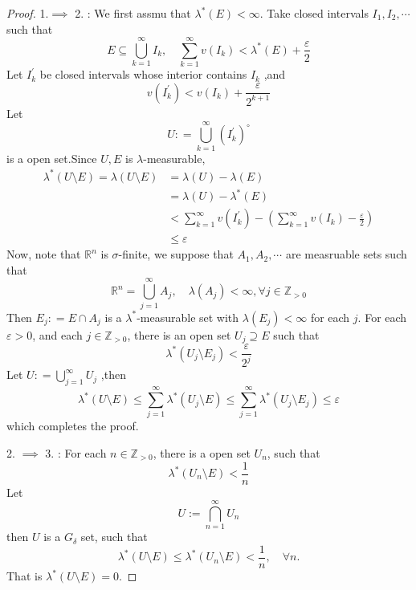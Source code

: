 \documentclass[../main.tex]{subfiles}
\begin{document}
 \begin{proof}
    1.\(  \implies   \) 2. : We first assmu that \(   \lambda ^{*}\left( E \right)< \infty   \).   Take closed intervals \(  I_1,I_2,\cdots   \) such that \[
    E\subseteq \bigcup _{k= 1}^{\infty}I _{k},\quad \sum _{k = 1}^{\infty}v\left( I _{k} \right)<  \lambda ^{*}\left( E \right)+ \frac{ \varepsilon  }{2 }   
    \] Let \(  I^{\prime} _{k}  \) be closed intervals whose interior contains \(  I _{k}  \) ,and \[
    v\left( I^{\prime} _{k} \right)< v\left( I _{k} \right)+ \frac{ \varepsilon  }{2^{k+ 1} }   
    \]   Let \[
    U : =  \bigcup _{k = 1}^{\infty} \left( I _{k}^{\prime}  \right)^{\circ} 
    \] is a open set.Since \(  U,E  \) is \(   \lambda   \)-measurable,   \[
    \begin{aligned}
     \lambda ^{*}\left( U\setminus E \right)=  \lambda \left( U\setminus E \right)  &=  \lambda \left( U \right)- \lambda \left( E \right)  \\ 
      &=  \lambda \left( U \right)- \lambda ^{*}\left( E \right)\\ 
       &<   \sum _{k = 1}^{\infty} v\left(  I _{k}^{\prime}  \right)- \left( \sum _{k = 1}^{\infty}v\left( I _{k} \right)- \frac{ \varepsilon  }{2 }   \right)\\ 
        &\le  \varepsilon      
    \end{aligned}
    \]
    Now, note that \(  \mathbb{R} ^{n}  \) is \(   \sigma   \)-finite, we suppose that \(  A_1,A_2,\cdots   \) are measruable sets such that \[
    \mathbb{R} ^{n}= \bigcup _{ j = 1}^{\infty}A_{j},\quad  \lambda \left( A_{j} \right)< \infty,\forall j\in \mathbb{Z} _{> 0} 
    \]   Then \(  E_{j}: = E\cap A_{j}  \) is a \(   \lambda ^{*}  \)-measurable set with \(   \lambda \left( E_{j} \right)< \infty   \) for each \(  j  \). For each \(   \varepsilon > 0  \), and each \(  j \in \mathbb{Z} _{> 0}  \), there is an open set \(  U_{j}\supseteq E  \) such that \[
     \lambda ^{*}\left( U_{j}\setminus E_{j} \right)<  \frac{ \varepsilon  }{2^{j} } 
    \] Let \(  U: = \bigcup _{j = 1}^{\infty}U_{j}  \)        ,then \[
     \lambda ^{*}\left( U\setminus E \right)\le \sum _{j= 1}^{\infty} \lambda ^{*}\left( U_{j}\setminus E \right)\le \sum _{j = 1}^{\infty}   \lambda ^{*}\left( U_{j}\setminus E_{j} \right)\le  \varepsilon  
    \] which completes the proof. 
    
    2. \(  \implies   \) 3. : For each \(  n \in \mathbb{Z} _{> 0}  \), there is a open set \(  U_{n}  \), such that \[
     \lambda ^{*}\left( U_{n}\setminus E \right)< \frac{1 }{n }  
    \]Let \[
    U:= \bigcap_{n = 1}^{\infty} U_{n} 
    \]   then \(  U  \) is a \(  G_{ \delta }  \) set, such that \[
     \lambda ^{*}\left( U\setminus E \right)\le  \lambda ^{*}\left( U_{n}\setminus E \right)< \frac{1 }{n },\quad \forall n.   
    \]That is \(   \lambda ^{*}\left( U\setminus E \right)= 0   \). 


\end{proof}
\end{document}

